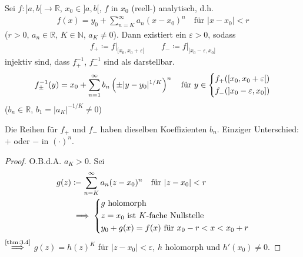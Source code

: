 \documentclass[a4paper,10pt]{scrbook}
\begin{document}
\begin{theorem}[Satz]
  Sei $f : ]a,b[ \to \mathbb{R}$, $x_0 \in ]a,b[$, $f$ in $x_0$ (reell-) analytisch, d.h.
  \begin{align*}
    f(x) = y_0 + \sum\limits_{n=K}^{\infty} a_n (x-x_0)^n \quad \text{für } |x-x_0| < r
  \end{align*}
  ($r>0$, $a_n \in \mathbb{R}$, $K \in \mathbb{N}$, $a_K \neq 0$). Dann existiert ein $\varepsilon > 0$, sodass
  \begin{align*}
    f_{+} \coloneq f \Big|_{[x_0,x_0+\varepsilon[} \qquad f_{-} \coloneq f \Big|_{]x_0-\varepsilon,x_0]}
  \end{align*}
  injektiv sind, dass $f_{+}^{-1}$, $f_{-}^{-1}$ sind als  darstellbar.
  \begin{align*}
    f_{\pm}^{-1}(y) = x_0 + \sum\limits_{n=1}^{\infty} b_n \left( \pm |y-y_0|^{1/K} \right)^n
    \quad \text{für } y \in
    \begin{dcases}
      f_{+}([x_0,x_0+\varepsilon[) \\
      f_{-}(]x_0-\varepsilon,x_0])
    \end{dcases}
  \end{align*}
  ($b_n \in \mathbb{R}$, $b_1 = |a_K|^{-1/K} \neq 0$)

  Die Reihen für $f_{+}$ und $f_{-}$ haben dieselben Koeffizienten $b_n$. Einziger Unterschied: $+$ oder $-$ in $(\cdot)^n$.

  \begin{proof} %
    O.B.d.A. $a_K > 0$. Sei
    \begin{align*}
      g(z) &\coloneq \sum\limits_{n=K}^{\infty} a_n (z-x_0)^n \quad \text{für } |z-x_0| < r \\
      &\implies
      \begin{dcases}
        g \text{ holomorph} \\
        z = x_0 \text{ ist $K$-fache Nullstelle} \\
        y_0 + g(x) = f(x) \text{ für } x_0 - r < x < x_0 + r
      \end{dcases}
    \end{align*}
    $\overset{\text{\ref{thm:3.4}}}{\implies}$ $g(z) = h(z)^K$ für $|z-x_0| < \varepsilon$, $h$ holomorph und $h'(x_0) \neq 0$.


\end{proof}
\end{theorem}
\end{document}
